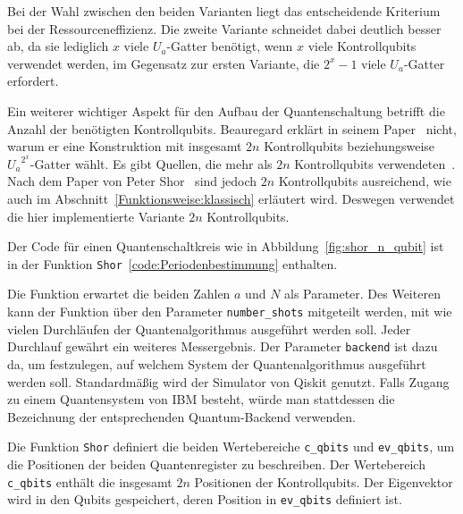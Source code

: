 Bei der Wahl zwischen den beiden Varianten liegt das entscheidende Kriterium bei der Ressourceneffizienz. 
Die zweite Variante schneidet dabei deutlich besser ab, 
da sie lediglich \(x\) viele \(U_a\)-Gatter benötigt, 
wenn \(x\) viele Kontrollqubits verwendet werden, 
im Gegensatz zur ersten Variante, die \(2^x-1\) viele \(U_a\)-Gatter erfordert.

Ein weiterer wichtiger Aspekt für den Aufbau der Quantenschaltung betrifft die Anzahl der benötigten Kontrollqubits.
Beauregard erklärt in seinem Paper~\cite{beauregard2003circuit} nicht, 
warum er eine Konstruktion mit insgesamt \(2n\) Kontrollqubits beziehungsweise \({U_a}^{2^x}\)-Gatter wählt.
Es gibt Quellen, die mehr als \(2n\)  Kontrollqubits verwendeten~\cite[229]{nielsen_chuang_2010}.
Nach dem Paper von Peter Shor~\cite{Shor_1997} sind jedoch \(2n\) Kontrollqubits ausreichend,
wie auch im Abschnitt~\ref{Funktionsweise:klassisch} erläutert wird.
Deswegen verwendet die hier implementierte Variante \(2n\) Kontrollqubits.

\bigskip

Der Code für einen Quantenschaltkreis wie in Abbildung~\ref{fig:shor_n_qubit} ist in der Funktion 
\texttt{Shor}~\ref{code:Periodenbestimmung} enthalten.

Die Funktion erwartet die beiden Zahlen \(a\) und \(N\) als Parameter.
Des Weiteren kann der Funktion über den Parameter \texttt{number_shots} mitgeteilt werden, 
mit wie vielen Durchläufen der Quantenalgorithmus ausgeführt werden soll.
Jeder Durchlauf gewährt ein weiteres Messergebnis.
Der Parameter \texttt{backend} ist dazu da, 
um festzulegen, auf welchem System der Quantenalgorithmus ausgeführt werden soll.
Standardmäßig wird der Simulator von Qiskit genutzt. 
Falls Zugang zu einem Quantensystem von IBM besteht, 
würde man stattdessen die Bezeichnung der entsprechenden Quantum-Backend verwenden.

Die Funktion \texttt{Shor} definiert die beiden Wertebereiche \texttt{c_qbits} und 
\texttt{ev_qbits}, um die Positionen der beiden Quantenregister zu beschreiben.
Der Wertebereich \texttt{c_qbits} enthält die insgesamt \(2n\) Positionen der Kontrollqubits.
Der Eigenvektor wird in den Qubits gespeichert, 
deren Position in \texttt{ev_qbits} definiert ist.

